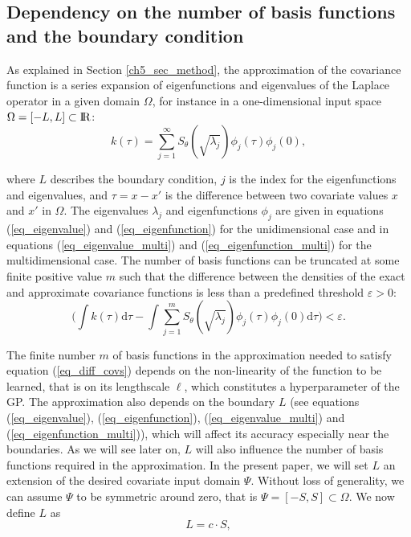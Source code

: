 \documentclass[onecolumn,a4paper,11pt]{article}
\begin{document}
\subsection{Dependency on the number of basis functions and the boundary condition} \label{ch5_subsec_dependency}

As explained in Section \ref{ch5_sec_method}, the approximation of the covariance function is a series expansion of eigenfunctions and eigenvalues of the Laplace operator in a given domain $\Omega$, for instance in a one-dimensional input space $\Omega=[-L,L]\subset {\rm I\!R}$:
%
\begin{equation*}
k(\tau) = \sum_{j=1}^{\infty} S_{\theta}(\sqrt{\lambda_j}) \phi_j(\tau) \phi_j(0), 
\end{equation*} 

\noindent where $L$ describes the boundary condition, $j$ is the index for the eigenfunctions and eigenvalues, and $\tau=x-x'$ is the difference between two covariate values $x$ and $x'$ in $\Omega$. The eigenvalues $\lambda_j$ and eigenfunctions $\phi_j$ are given in equations (\ref{eq_eigenvalue}) and (\ref{eq_eigenfunction}) for the unidimensional case and in equations (\ref{eq_eigenvalue_multi}) and (\ref{eq_eigenfunction_multi}) for the multidimensional case. The number of basis functions can be truncated at some finite positive value $m$ such that the difference between the densities of the exact and approximate covariance functions is less than a predefined threshold $\varepsilon > 0$:
%
\begin{equation}\label{eq_diff_covs}
\Big( \int k(\tau) \mathrm{d}\tau - 
\int \sum_{j=1}^m S_{\theta}(\sqrt{\lambda_j}) \phi_j(\tau) \phi_j(0) \mathrm{d}\tau \Big) < \varepsilon.
\end{equation}

The finite number $m$ of basis functions in the approximation needed to satisfy equation (\ref{eq_diff_covs}) depends on the non-linearity of the function to be learned, that is on its lengthscale $\ell$, which constitutes a hyperparameter of the GP. The approximation also depends on the boundary $L$ (see equations (\ref{eq_eigenvalue}), (\ref{eq_eigenfunction}), (\ref{eq_eigenvalue_multi}) and (\ref{eq_eigenfunction_multi})), which will affect its accuracy especially near the boundaries. As we will see later on, $L$ will also influence the number of basis functions required in the approximation. In the present paper, we will set $L$ an extension of the desired covariate input domain $\Psi$. Without loss of generality, we can assume $\Psi$ to be symmetric around zero, that is $\Psi=[-S,S] \subset \Omega$. We now define $L$ as
%
\begin{equation}\label{eq_boundary}
L=c \cdot S,
\end{equation} 
\end{document}
